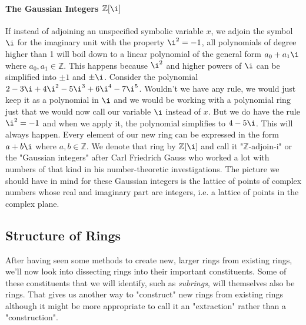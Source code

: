 

\paragraph{The Gaussian Integers $\mathbb{Z}[\i]$}
If instead of adjoining an unspecified symbolic variable $x$, we adjoin the symbol $\i$ for the imaginary unit with the property $\i^2 = -1$, all polynomials of degree higher than 1 will boil down to a linear polynomial of the general form $a_0 + a_1 \i$ where $a_0,a_1 \in \mathbb{Z}$. This happens because $\i^2$ and higher powers of $\i$ can be simplified into $\pm 1$ and $\pm \i$. Consider the polynomial $2 - 3 \i + 4 \i^2 - 5 \i^3 + 6 \i^4 - 7 \i^5$. Wouldn't we have any rule, we would just keep it as a polynomial in $\i$ and we would be working with a polynomial ring just that we would now call our variable $\i$ instead of $x$. But we do have the rule $\i^2 = -1$ and when we apply it, the polynomial simplifies to $4 - 5 \i$. This will always happen. Every element of our new ring can be expressed in the form $a + b \i$ where $a,b \in \mathbb{Z}$. We denote that ring by $\mathbb{Z}[\i]$ and call it "$\mathbb{Z}$-adjoin-i" or the "Gaussian integers" after Carl Friedrich Gauss who worked a lot with numbers of that kind in his number-theoretic investigations. The picture we should have in mind for these Gaussian integers is the lattice of points of complex numbers whose real and imaginary part are integers, i.e. a lattice of points in the complex plane.

\subsection{Structure of Rings}
After having seen some methods to create new, larger rings from existing rings, we'll now look into dissecting rings into their important constituents. Some of these constituents that we will identify, such as \emph{subrings}, will themselves also be rings. That gives us another way to "construct" new rings from existing rings although it might be more appropriate to call it an "extraction" rather than a "construction".



